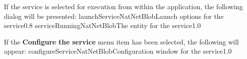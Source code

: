 \insertStandardServiceCommands
\secondaryEnd
{}
If the service is selected for execution from within the \emph{\MMMU} application, the
following dialog will be presented:
%
{launchServiceNatNetBlob}{Launch options for the \emph{\NNBI} service}{0.8}
\condPage
{}%
{serviceRunningNatNetBlob}{The \emph{\MMMU} entity for the \emph{\NNBI} service}{1.0}

If the \textbf{Configure the service} menu item has been selected, the following will
appear:
%
{configureServiceNatNetBlob}{Configuration window for the \emph{\NNBI} service}{1.0}
\secondaryEnd
\primaryEnd{}
